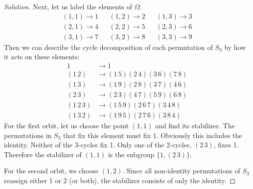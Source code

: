 \documentclass{article}
\begin{document}
\begin{proof}[Solution]
    Next, let us label the elements of $\Omega$:
    \begin{align*}
        (1, 1) \rightarrow 1 & & (1, 2) \rightarrow 2 & & (1, 3) \rightarrow 3 \\
        (2, 1) \rightarrow 4 & & (2, 2) \rightarrow 5 & & (2, 3) \rightarrow 6 \\
        (3, 1) \rightarrow 7 & & (3, 2) \rightarrow 8 & & (3, 3) \rightarrow 9
    \end{align*}
    Then we can describe the cycle decomposition of each permutation of $S_3$ by how it acts on these elements:
    \begin{align*}
        1 &\rightarrow 1 \\
        (1\,2) &\rightarrow (1\,5)(2\,4)(3\,6)(7\,8) \\
        (1\,3) &\rightarrow (1\,9)(2\,8)(3\,7)(4\,6) \\
        (2\,3) &\rightarrow (2\,3)(4\,7)(5\,9)(6\,8) \\
        (1\,2\,3) &\rightarrow (1\,5\,9)(2\,6\,7)(3\,4\,8) \\
        (1\,3\,2) &\rightarrow (1\,9\,5)(2\,7\,6)(3\,8\,4)
    \end{align*}
    For the first orbit, let us choose the point $(1, 1)$ and find its stabilizer. The permutations in $S_3$ that fix this element must fix 1. Obviously this includes the identity. Neither of the 3-cycles fix 1. Only one of the 2-cycles, $(2\,3)$, fixes 1. Therefore the stabilizer of $(1, 1)$ is the subgroup $\{ 1, (2\,3) \}$.

    For the second orbit, we choose $(1, 2)$. Since all non-identity permutations of $S_3$ reassign either 1 or 2 (or both), the stabilizer consists of only the identity.
\end{proof}
\end{document}
